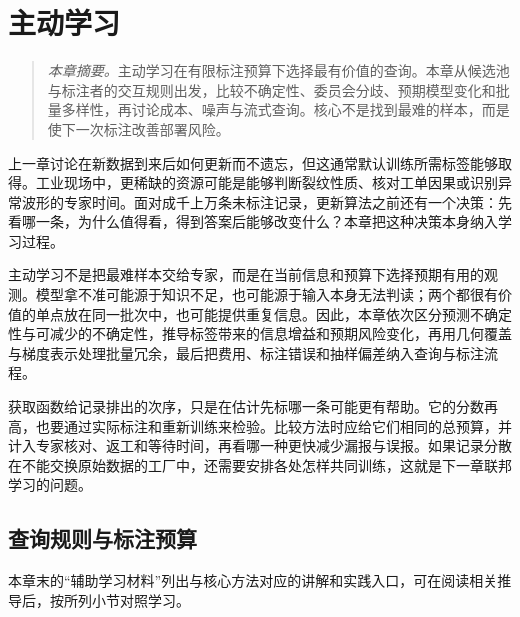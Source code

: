 ﻿\chapter{主动学习}
\label{chap:active}
\begin{quote}\small
\textit{本章摘要。}主动学习在有限标注预算下选择最有价值的查询。本章从候选池与标注者的交互规则出发，比较不确定性、委员会分歧、预期模型变化和批量多样性，再讨论成本、噪声与流式查询。核心不是找到最难的样本，而是使下一次标注改善部署风险。
\end{quote}

上一章讨论在新数据到来后如何更新而不遗忘，但这通常默认训练所需标签能够取得。工业现场中，更稀缺的资源可能是能够判断裂纹性质、核对工单因果或识别异常波形的专家时间。面对成千上万条未标注记录，更新算法之前还有一个决策：先看哪一条，为什么值得看，得到答案后能够改变什么？本章把这种决策本身纳入学习过程。

主动学习不是把最难样本交给专家，而是在当前信息和预算下选择预期有用的观测。模型拿不准可能源于知识不足，也可能源于输入本身无法判读；两个都很有价值的单点放在同一批次中，也可能提供重复信息。因此，本章依次区分预测不确定性与可减少的不确定性，推导标签带来的信息增益和预期风险变化，再用几何覆盖与梯度表示处理批量冗余，最后把费用、标注错误和抽样偏差纳入查询与标注流程。

获取函数给记录排出的次序，只是在估计先标哪一条可能更有帮助。它的分数再高，也要通过实际标注和重新训练来检验。比较方法时应给它们相同的总预算，并计入专家核对、返工和等待时间，再看哪一种更快减少漏报与误报。如果记录分散在不能交换原始数据的工厂中，还需要安排各处怎样共同训练，这就是下一章联邦学习的问题。

\section{查询规则与标注预算}

本章末的“辅助学习材料”列出与核心方法对应的讲解和实践入口，可在阅读相关推导后，按所列小节对照学习。

